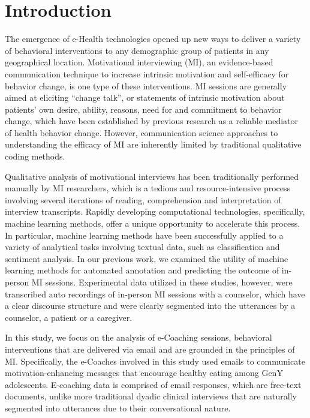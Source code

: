 \documentclass{amia}
\begin{document}
\section*{Introduction}
The emergence of e-Health technologies opened up new ways to deliver a variety of behavioral interventions to any demographic group of patients in any geographical location. Motivational interviewing (MI), an evidence-based communication technique to increase intrinsic motivation and self-efficacy for behavior change,\cite{miller2012motivational,miller2009toward} is one type of these interventions. MI sessions are generally aimed at eliciting ``change talk'', or statements of intrinsic motivation about patients' own desire, ability, reasons, need for and commitment to behavior change, which have been established by previous research\cite{apodaca2009mechanisms} as a reliable mediator of health behavior change. However, communication science approaches to understanding the efficacy of MI are inherently limited by traditional qualitative coding methods. 

Qualitative analysis of motivational interviews has been traditionally performed manually by MI researchers, which is a tedious and resource-intensive process involving several iterations of reading, comprehension and interpretation of interview transcripts. Rapidly developing computational technologies, specifically, machine learning methods, offer a unique opportunity to accelerate this process. In particular, machine learning methods have been successfully applied to a variety of analytical tasks involving textual data, such as classification\cite{nigam2000text} and sentiment analysis.\cite{wang2012baselines} In our previous work, we examined the utility of machine learning methods for automated annotation \cite{hasan2016study,kotov2015interpretable} and predicting the outcome \cite{hasan2018predicting} of in-person MI sessions. Experimental data utilized in these studies, however, were transcribed auto recordings of in-person MI sessions with a counselor, which have a clear discourse structure and were clearly segmented into the utterances by a counselor, a patient or a caregiver. 

In this study, we focus on the analysis of e-Coaching sessions, behavioral interventions that are delivered via email and are grounded in the principles of MI. Specifically, the e-Coaches involved in this study used emails to communicate motivation-enhancing messages that encourage healthy eating among GenY adolescents. E-coaching data is comprised of email responses, which are free-text documents, unlike more traditional dyadic clinical interviews that are naturally segmented into utterances due to their conversational nature.
\end{document}
